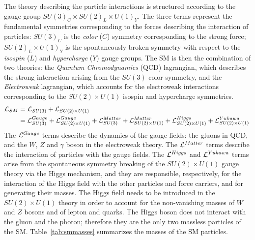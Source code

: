 The theory describing the particle interactions is structured
according to the gauge group $SU(3)_C\times{}SU(2)_L\times{}U(1)_Y$. The three
terms represent the fundamental symmetries corresponding to the forces describing the
interaction of particles: $SU(3)_C$ is the {\it color} ($C$) symmetry corresponding
to the strong force; $SU(2)_L\times{}U(1)_Y$ is the spontaneously
broken symmetry with respect to the {\it isospin} ($L$)
and {\it hypercharge} ($Y$) gauge groups.
The SM is then the combination of two theories: the {\it Quantum
  Chromodynamics} (QCD) lagrangian, which describes the strong
interaction arising from the $SU(3)$ color symmetry, and the {\it
  Electroweak} lagrangian, which accounts for the electroweak
interactions corresponding to the $SU(2)\times{}U(1)$ isospin and
hypercharge symmetries.
\begin{equation}
\begin{split}
\mathcal{L}{}_{SM}  & = \mathcal{L}{}_{SU(3)} + \mathcal{L}{}_{SU(2)\times{}U(1)} \\
& = \mathcal{L}{}_{SU(3)}^{Gauge} 
+ \mathcal{L}{}_{SU(2)\times{}U(1)}^{Gauge} 
+ \mathcal{L}{}_{SU(3)}^{Matter}
+ \mathcal{L}{}_{SU(2)\times{}U(1)}^{Matter}
+ \mathcal{L}{}_{SU(2)\times{}U(1)}^{Higgs} +
\mathcal{L}{}_{SU(2)\times{}U(1)}^{Yukawa} \\
\end{split}
\phantom{.}
\end{equation}
The $\mathcal{L}{}^{Gauge}$ terms describe the dynamics of the gauge fields:
the gluons in QCD, and the $W$, $Z$ and $\gamma$ boson in the
electroweak theory.
The $\mathcal{L}{}^{Matter}$ terms describe the
interaction of particles with the gauge fields. The $\mathcal{L}{}^{Higgs}$
and $\mathcal{L}{}^{Yukawa}$ terms arise from the spontaneous symmetry
breaking of the $SU(2)\times{}U(1)$ gauge theory via the Higgs
mechanism, and they are responsible, respectively, for the interaction
of the Higgs field with the other particles and force carriers, and
for generating their masses.
The Higgs field
needs to be introduced in
the $SU(2)\times{}U(1)$ theory in order to account for the
non-vanishing masses of $W$ and $Z$ bosons and of lepton and quarks.
The Higgs boson does not interact with the gluon and the photon;
therefore they are the only two massless particles of the
SM. Table~\ref{tab:smmasses} summarizes the masses of the SM particles.

